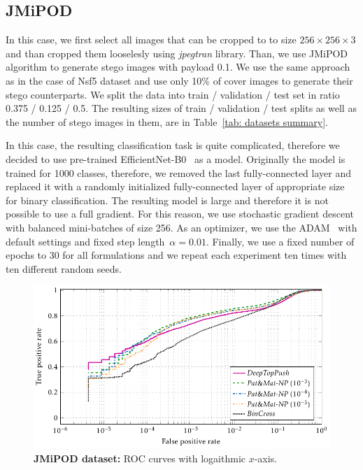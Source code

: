 \subsection{JMiPOD}

In this case, we first select all images that can be cropped to to size $256 \times 256 \times 3$ and than cropped them looselesly using \emph{jpegtran} library. Than, we use JMiPOD~\cite{cogranne2020steganography} algorithm to generate stego images with payload 0.1. We use the same approach as in the case of Nsf5 dataset and use only 10\% of cover images to generate their stego counterparts. We split the data into train / validation / test set in ratio 0.375 / 0.125 / 0.5. The resulting sizes of train / validation / test splits as well as the number of stego images in them, are in Table~\ref{tab: datasets summary}. 

In this case, the resulting classification task is quite complicated, therefore we decided to use pre-trained EfficientNet-B0~\cite{tan2019efficientnet} as a model. Originally the model is trained for 1000 classes, therefore, we removed the last fully-connected layer and replaced it with a randomly initialized fully-connected layer of appropriate size for binary classification. The resulting model is large and therefore it is not possible to use a full gradient. For this reason, we use stochastic gradient descent with balanced mini-batches of size 256. As an optimizer, we use the ADAM~\cite{kingma2014adam} with default settings and fixed step length~$\alpha = 0.01.$ Finally, we use a fixed number of epochs to 30 for all formulations and we repeat each experiment ten times with ten different random seeds.

\begin{figure}[!t]
  \centering
  \includegraphics{images/stego_jmipod.pdf}
  \caption{\textbf{JMiPOD dataset:} ROC curves with logaithmic $x$-axis.}
  \label{fig: steganalysis jmipod}
\end{figure}

